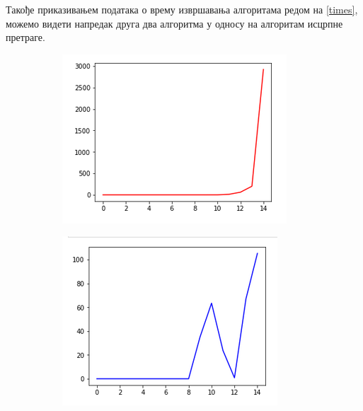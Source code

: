 \documentclass[a4paper]{article}
\begin{document}
{Такође приказивањем података о врему извршавања алгоритама редом на \ref{times}, можемо видети напредак друга два алгоритма у односу на алгоритам исцрпне претраге.
\begin{figure}[h!]
	\centering
	\begin{subfigure}{.3\textwidth}
		\centering
		\includegraphics[width=\linewidth]{images/bf_time.png}
	\end{subfigure}
	\begin{subfigure}{.3\textwidth}
		\centering
		\includegraphics[width=\linewidth]{images/ga_time.png}
	\end{subfigure}
	\begin{subfigure}{.3\textwidth}

\end{subfigure}
\end{figure}}
\end{document}
